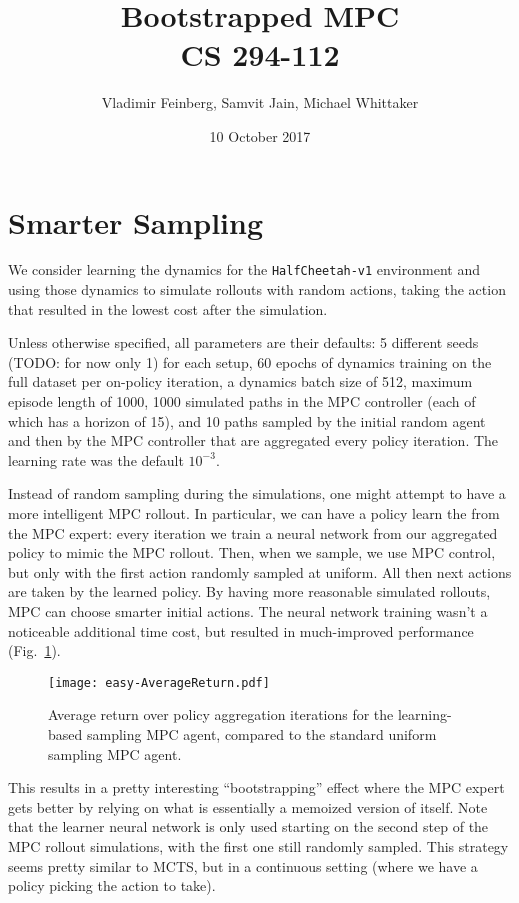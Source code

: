 \documentclass{article}
\title{Bootstrapped MPC\\\large CS 294-112}
\author{Vladimir Feinberg, Samvit Jain, Michael Whittaker}
\date{10 October 2017}
\begin{document}
	
\maketitle

\section{Smarter Sampling}\label{smart-sample}

We consider learning the dynamics for the \texttt{HalfCheetah-v1} environment and using those dynamics to simulate rollouts with random actions, taking the action that resulted in the lowest cost after the simulation.

Unless otherwise specified, all parameters are their defaults: 5 different seeds (TODO: for now only 1) for each setup, 60 epochs of dynamics training on the full dataset per on-policy iteration, a dynamics batch size of 512, maximum episode length of 1000, 1000 simulated paths in the MPC controller (each of which has a horizon of 15), and 10 paths sampled by the initial random agent and then by the MPC controller that are aggregated every policy iteration. The learning rate was the default $10^{-3}$.

Instead of random sampling during the simulations, one might attempt to have a more intelligent MPC rollout. In particular, we can have a policy learn the from the MPC expert: every iteration we train a neural network from our aggregated policy to mimic the MPC rollout. Then, when we sample, we use MPC control, but only with the first action randomly sampled at uniform. All then next actions are taken by the learned policy. By having more reasonable simulated rollouts, MPC can choose smarter initial actions. The neural network training wasn't a noticeable additional time cost, but resulted in much-improved performance (Fig.~\ref{fig:mpcmf}).

\begin{figure}[!h]
  \begin{center}
    {\texttt{[image: easy-AverageReturn.pdf]}}
  \end{center}
  \caption{Average return over policy aggregation iterations for the learning-based sampling MPC agent, compared to the standard uniform sampling MPC agent.}
\label{fig:mpcmf}
\end{figure}

This results in a pretty interesting ``bootstrapping'' effect where the MPC expert gets better by relying on what is essentially a memoized version of itself. Note that the learner neural network is only used starting on the second step of the MPC rollout simulations, with the first one still randomly sampled. This strategy seems pretty similar to MCTS, but in a continuous setting (where we have a policy picking the action to take).
\end{document}

